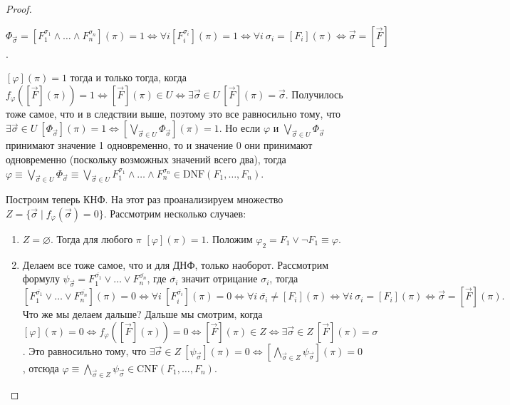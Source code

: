 \documentclass[a4paper, fleqn]{article}
\begin{document}
\begin{proof}
\begin{enumerate}
\begin{corollary}
                $\Phi_{\vec{\sigma}} = [F_{1}^{\sigma_{1}} \land \ldots \land 
                F_{n}^{\sigma_{n}}](\pi) = 1 \iff \forall i [F_{i}^{\sigma_{i}}](\pi) = 1 \iff 
                \forall i~\sigma_{i} = [F_{i}](\pi) \iff \vec{\sigma} = [\vec{F}]$.
            \end{corollary}
            $[\varphi](\pi) = 1$ тогда и только тогда, когда $f_{\varphi}([\vec{F}](\pi)) = 1 \iff [\vec{F}](\pi) 
            \in U \iff \exists \vec{\sigma} \in U~ [\vec{F}](\pi) = \vec{\sigma}$.
            Получилось тоже самое, что и в следствии выше, 
            поэтому это все равносильно тому, что $\exists \vec{\sigma} \in 
            U~[\Phi_{\vec{\sigma}}](\pi) = 1 \iff [\bigvee\limits_{\vec{\sigma} 
            \in U}\Phi_{\vec{\sigma}}](\pi) = 1$.
            Но если $\varphi$ и $\bigvee\limits_{\vec{\sigma} \in U}\Phi_{\vec{\sigma}}$ 
            принимают значение 1 одновременно, то и значение 0 они принимают одновременно 
            (поскольку возможных значений всего два), тогда $\varphi \equiv 
            \bigvee\limits_{\vec{\sigma} \in U}\Phi_{\vec{\sigma}} \equiv 
            \bigvee\limits_{\vec{\sigma} \in U} F_{1}^{\sigma_{1}} \land \ldots
             \land F_{n}^{\sigma_{n}} \in \text{DNF}(F_{1}, \ldots, F_{n})$.
        \end{enumerate}
        Построим теперь КНФ.
        На этот раз проанализируем множество $Z = \{\vec{\sigma} \mid 
        f_{\varphi}(\vec{\sigma}) = 0\}$.
        Рассмотрим несколько случаев:
        \begin{enumerate}
            \item $Z = \varnothing$.
            Тогда для любого $\pi$ $[\varphi](\pi) = 1$.
            Положим $\varphi_{2} = F_{1} \lor \neg F_{1} \equiv \varphi$.
            \item Делаем все тоже самое, что и для ДНФ, только наоборот.
            Рассмотрим формулу $\psi_{\vec{\sigma}} = F_{1}^{\overline{\sigma_{1}}} 
            \lor \ldots \lor F_{n}^{\overline{\sigma_{n}}}$, где $\overline{\sigma_{i}}$ 
            значит отрицание $\sigma_{i}$, тогда
            \[
                \left[F_{1}^{\overline{\sigma_{1}}} \lor \ldots \lor 
                F_{n}^{\overline{\sigma_{n}}}\right](\pi) = 0 \iff \forall i~ 
                [F_{i}^{\overline{\sigma_{i}}}](\pi) = 0 \iff \forall i~ \overline{\sigma_{i}} 
                \neq [F_{i}](\pi) \iff \forall i~ \sigma_{i} = [F_{i}](\pi) \iff \vec{\sigma} = 
                [\vec{F}](\pi).
            \]
            Что же мы делаем дальше?
            Дальше мы смотрим, когда $[\varphi](\pi) = 0 \iff f_{\varphi}([\vec{F}](\pi)) = 0 
            \iff [\vec{F}](\pi) \in Z \iff \exists\vec{\sigma} \in Z~ [\vec{F}](\pi) = \sigma$.
            Это равносильно тому, что $\exists \vec{\sigma} \in Z~[\psi_{\vec{\sigma}}](\pi) = 0 
            \iff [\bigwedge\limits_{\vec{\sigma} \in Z}\psi_{\vec{\sigma}}](\pi) = 0$, отсюда 
            $\varphi \equiv \bigwedge\limits_{\vec{\sigma} \in Z}\psi_{\vec{\sigma}} \in \text{CNF}(F_{1}, 
            \ldots, F_{n})$.
        \end{enumerate}
    \end{proof}
    
\end{document}
